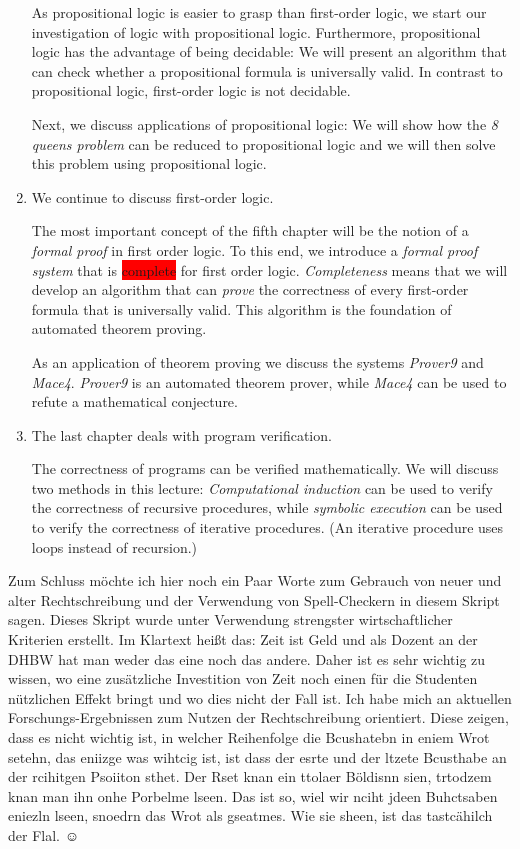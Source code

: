 \begin{enumerate}
      As propositional logic is easier to grasp than first-order logic, we start our investigation
      of logic with propositional logic.  Furthermore, propositional logic has the advantage of
      being decidable:  We will present an algorithm that can check whether a propositional formula
      is universally valid.  In contrast to propositional logic, first-order logic is not decidable.

      Next, we discuss applications of propositional logic:  We will show how the \emph{8 queens problem} 
      can be reduced to propositional logic and we will then solve this problem using propositional logic.
\item We continue to discuss first-order logic.

      The most important concept of the fifth chapter will be the notion of a \emph{formal proof} in
      first order logic.  To this end, we introduce a \emph{formal proof system} that is
      \colorbox{red}{complete} for first order logic.  \emph{Completeness} means that we will develop an
      algorithm that can \emph{prove} the correctness of every first-order formula that is
      universally valid.  This algorithm is the foundation of automated theorem proving.

      As an application of theorem proving we discuss the systems \textsl{Prover9} and
      \textsl{Mace4}.  \textsl{Prover9} is an automated theorem prover, while \textsl{Mace4} can be
      used to refute a mathematical conjecture.

\item The last chapter deals with program verification.

      The correctness of programs can be verified mathematically.  We will discuss two methods in
      this lecture: \emph{Computational induction} can be used to verify the correctness of
      recursive procedures, while \emph{symbolic execution} can be used to verify the correctness of
      iterative procedures. (An iterative procedure uses loops instead of recursion.)
\end{enumerate}


\remark
Zum Schluss m\"{o}chte ich hier noch ein Paar Worte zum Gebrauch von neuer und alter
Rechtschreibung und der Verwendung von Spell-Checkern in diesem Skript sagen.
Dieses Skript wurde unter Verwendung strengster wirtschaftlicher Kriterien
erstellt.  Im Klartext hei\ss{}t das: Zeit ist Geld und als Dozent an der DHBW hat man
weder das eine noch das andere.  Daher ist es sehr wichtig zu wissen, wo eine
zus\"{a}tzliche Investition von Zeit noch einen f\"{u}r die Studenten n\"{u}tzlichen Effekt
bringt und wo dies nicht der Fall ist.  Ich habe mich an aktuellen
Forschungs-Ergebnissen zum Nutzen der Rechtschreibung orientiert. Diese zeigen,
dass es nicht wichtig ist, in welcher Reihenfolge die Bcushatebn in eniem Wrot
setehn, das eniizge was wihtcig ist, ist dass der esrte und der ltzete Bcusthabe
an der rcihitgen Psoiiton sthet. Der Rset knan ein ttolaer B\"{o}ldisnn sien,
trtodzem knan man ihn onhe Porbelme lseen. Das ist so, wiel wir nciht jdeen
Buhctsaben eniezln lseen, snoedrn das Wrot als gseatmes.  Wie sie sheen, ist das
tastc\"{a}hilch der Flal. $\displaystyle\smiley$

